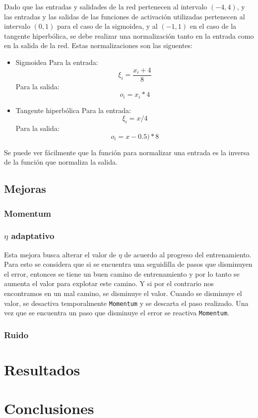 \documentclass[a4paper,10pt]{article}
\begin{document}
        Dado que las entradas y salidades de la red pertenecen al intervalo $(-4, 4)$, y las entradas y las salidas de las funciones de activación utilizadas 
        pertenecen al intervalo $(0,1)$ para el caso de la sigmoidea, y al $(-1,1)$ en el caso de la tangente hiperbólica, se debe realizar una normalización 
        tanto en la entrada como en la salida de la red. Estas normalizaciones son las siguentes:

        \begin{itemize}
            \item Sigmoidea
                Para la entrada: \[ \xi_{i} = \frac{x_{i} + 4}{8} \]
                Para la salida: \[ o_{i} = x_{i} * 4 \]
            \item Tangente hiperbólica
                Para la entrada: \[ \xi_{i} = x / 4 \]
                Para la salida: \[ o_{i} = x - 0.5) * 8 \]
        \end{itemize}

        Se puede ver fácilmente que la función para normalizar una entrada es la inversa de la función que normaliza la salida.

\subsection{Mejoras}

    \subsubsection{Momentum}

    \subsubsection{$\eta$ adaptativo}

    Esta mejora busca alterar el valor de $\eta$ de acuerdo al progreso del entrenamiento.
    Para esto se considera que si se encuentra una seguidilla de pasos que disminuyen el error, entonces se tiene un buen camino de entrenamiento y por lo tanto se aumenta 
    el valor para explotar este camino. Y si por el contrario nos encontramos en un mal camino, se disminuye el valor.
    Cuando se disminuye el valor, se desactiva temporalmente \texttt{Momentum} y se descarta el paso realizado.
    Una vez que se encuentra un paso que disminuye el error se reactiva \texttt{Momentum}.

    \subsubsection{Ruido}

\section{Resultados}

\section{Conclusiones}



\end{document}
